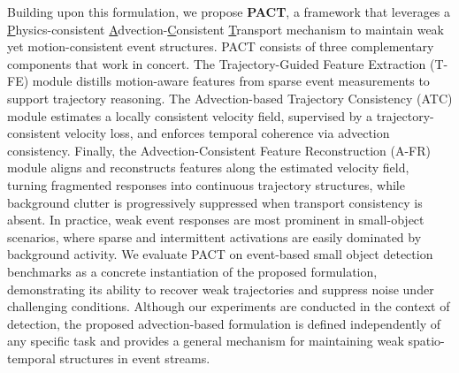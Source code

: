 \documentclass[runningheads]{llncs}
\begin{document}
Building upon this formulation, we propose \textbf{PACT}, a framework that leverages a \underline{P}hysics-consistent \underline{A}dvection-\underline{C}onsistent \underline{T}ransport mechanism to maintain weak yet motion-consistent event structures.
PACT consists of three complementary components that work in concert.
The Trajectory-Guided Feature Extraction (T-FE) module distills motion-aware features from sparse event measurements to support trajectory reasoning.
The Advection-based Trajectory Consistency (ATC) module estimates a locally consistent velocity field, supervised by a trajectory-consistent velocity loss, and enforces temporal coherence via advection consistency.
Finally, the Advection-Consistent Feature Reconstruction (A-FR) module aligns and reconstructs features along the estimated velocity field, turning fragmented responses into continuous trajectory structures, while background clutter is progressively suppressed when transport consistency is absent.
In practice, weak event responses are most prominent in small-object scenarios, where sparse and intermittent activations are easily dominated by background activity.
We evaluate PACT on event-based small object detection benchmarks as a concrete instantiation of the proposed formulation, demonstrating its ability to recover weak trajectories and suppress noise under challenging conditions.
Although our experiments are conducted in the context of detection, the proposed advection-based formulation is defined independently of any specific task and provides a general mechanism for maintaining weak spatio-temporal structures in event streams.
\end{document}
